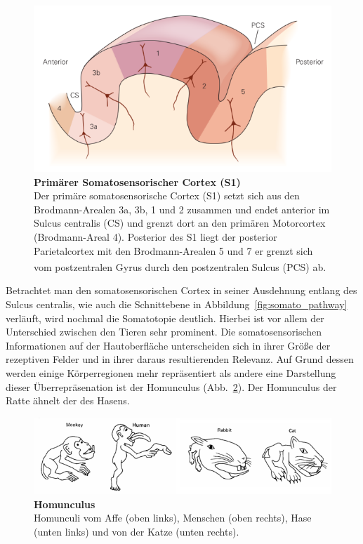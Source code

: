 \documentclass[12pt,a4paper,pdftex]{article}
\begin{document}
\begin{figure}[H]
    \centering
    \includegraphics{pictures/somatosensory/S1_Cortex.png}
    \caption[Primärer Somatosensorischer Cortex]{\textbf{Primärer Somatosensorischer Cortex (S1)}\\
    Der primäre somatosensorische Cortex (S1) setzt sich aus den Brodmann-Arealen 3a, 3b, 1 und 2 zusammen und endet anterior im Sulcus centralis (CS) und grenzt dort an den primären Motorcortex (Brodmann-Areal 4). Posterior des S1 liegt der posterior Parietalcortex mit den Brodmann-Arealen 5 und 7 er grenzt sich vom postzentralen Gyrus durch den postzentralen Sulcus (PCS) ab.
    \textsuperscript{\cite[23]{kandel2013principles}}}
    \label{fig:S1_Cortex}
\end{figure}

Betrachtet man den somatosensorischen Cortex in seiner Ausdehnung entlang des Sulcus centralis, wie auch die Schnittebene in Abbildung~\ref{fig:somato_pathway} verläuft, wird nochmal die Somatotopie deutlich. Hierbei ist vor allem der Unterschied zwischen den Tieren sehr prominent. Die somatosensorischen Informationen auf der Hautoberfläche unterscheiden sich in ihrer Größe der rezeptiven Felder und in ihrer daraus resultierenden Relevanz. Auf Grund dessen werden einige Körperregionen mehr repräsentiert als andere eine Darstellung dieser Überrepräsenation ist der Homunculus (Abb.~\ref{fig:somato_homunculus}). Der Homunculus der Ratte ähnelt der des Hasens. 
\\

\begin{figure}[H]
    \centering
    \includegraphics[width = \textwidth] {pictures/somatosensory/homunculus.png}
    \caption[Homunculus]{\textbf{Homunculus}\\
    Homunculi vom Affe (oben links), Menschen (oben rechts), Hase (unten links) und von der Katze (unten rechts).}
    \label{fig:somato_homunculus}
\end{figure}
\end{document}
